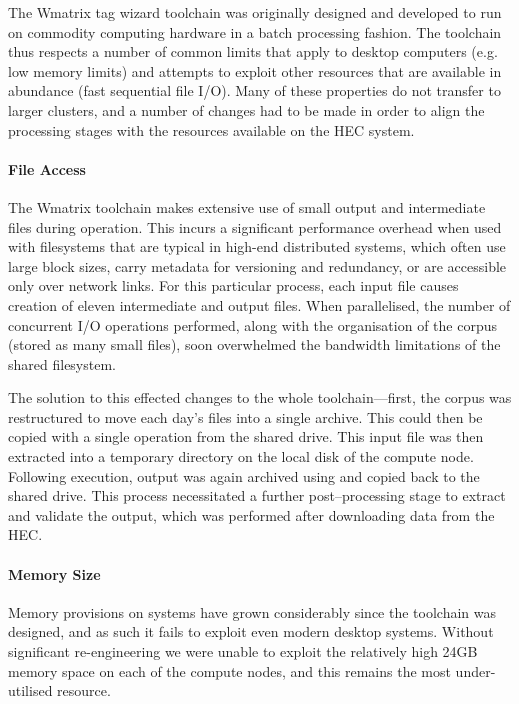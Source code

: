 
The Wmatrix tag wizard toolchain was originally designed and developed to run on commodity computing hardware in a batch processing fashion.  The toolchain thus respects a number of common limits that apply to desktop computers (e.g. low memory limits) and attempts to exploit other resources that are available in abundance (fast sequential file I/O).
Many of these properties do not transfer to larger clusters, and a number of changes had to be made in order to align the processing stages with the resources available on the HEC system.


\paragraph{File Access}
The Wmatrix toolchain makes extensive use of small output and intermediate files during operation.  This incurs a significant performance overhead when used with filesystems that are typical in high-end distributed systems, which often use large block sizes, carry metadata for versioning and redundancy, or are accessible only over network links.
For this particular process, each input file causes creation of eleven intermediate and output files.  When parallelised, the number of concurrent I/O operations performed, along with the organisation of the corpus (stored as many small files), soon overwhelmed the bandwidth limitations of the shared filesystem.

The solution to this effected changes to the whole toolchain---first, the corpus was restructured to move each day's files into a single  archive.  This could then be copied with a single operation from the shared drive.
This input file was then extracted into a temporary directory on the local disk of the compute node.
Following execution, output was again archived using  and copied back to the shared drive.  This process necessitated a further post--processing stage to extract and validate the output, which was performed after downloading data from the HEC.


\paragraph{Memory Size}
Memory provisions on systems have grown considerably since the toolchain was designed, and as such it fails to exploit even modern desktop systems. 
Without significant re-engineering we were unable to exploit the relatively high 24GB memory space on each of the compute nodes, and this remains the most under-utilised resource.




